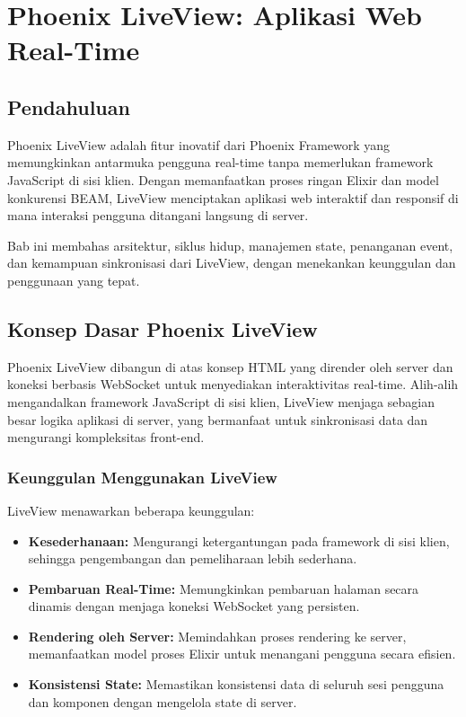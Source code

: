 \chapter{Phoenix LiveView: Aplikasi Web Real-Time}
\section{Pendahuluan}
Phoenix LiveView adalah fitur inovatif dari Phoenix Framework yang memungkinkan antarmuka pengguna real-time tanpa memerlukan framework JavaScript di sisi klien. Dengan memanfaatkan proses ringan Elixir dan model konkurensi BEAM, LiveView menciptakan aplikasi web interaktif dan responsif di mana interaksi pengguna ditangani langsung di server.

Bab ini membahas arsitektur, siklus hidup, manajemen state, penanganan event, dan kemampuan sinkronisasi dari LiveView, dengan menekankan keunggulan dan penggunaan yang tepat.

\section{Konsep Dasar Phoenix LiveView}
Phoenix LiveView dibangun di atas konsep HTML yang dirender oleh server dan koneksi berbasis WebSocket untuk menyediakan interaktivitas real-time. Alih-alih mengandalkan framework JavaScript di sisi klien, LiveView menjaga sebagian besar logika aplikasi di server, yang bermanfaat untuk sinkronisasi data dan mengurangi kompleksitas front-end.

\subsection{Keunggulan Menggunakan LiveView}
LiveView menawarkan beberapa keunggulan:
\begin{itemize}
	\item \textbf{Kesederhanaan:} Mengurangi ketergantungan pada framework di sisi klien, sehingga pengembangan dan pemeliharaan lebih sederhana.
	\item \textbf{Pembaruan Real-Time:} Memungkinkan pembaruan halaman secara dinamis dengan menjaga koneksi WebSocket yang persisten.
	\item \textbf{Rendering oleh Server:} Memindahkan proses rendering ke server, memanfaatkan model proses Elixir untuk menangani pengguna secara efisien.
	\item \textbf{Konsistensi State:} Memastikan konsistensi data di seluruh sesi pengguna dan komponen dengan mengelola state di server.
\end{itemize}

